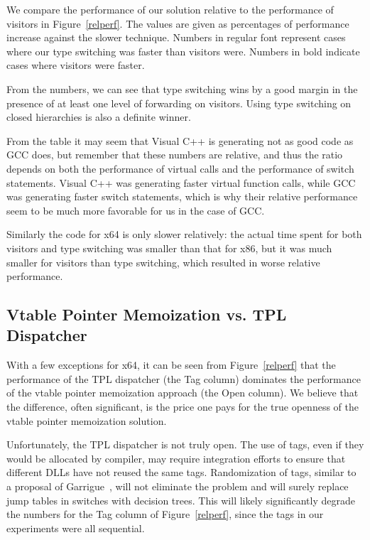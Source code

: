 \documentclass[preprint]{sigplanconf}
\begin{document}
We compare the performance of our solution relative to the performance of visitors in 
Figure~\ref{relperf}. The values are given as percentages of performance increase 
against the slower technique. Numbers in regular font represent cases where our type 
switching was faster than visitors were. Numbers in bold indicate cases where 
visitors were faster.

From the numbers, we can see that type switching wins by a good margin in 
the presence of at least one level of forwarding on visitors. Using type 
switching on closed hierarchies is also a definite winner.

From the table it may seem that Visual C++ is generating not as good code as GCC 
does, but remember that these numbers are relative, and thus the ratio depends on  
both the performance of virtual calls and the performance of switch statements. Visual 
C++ was generating faster virtual function calls, while GCC was generating 
faster switch statements, which is why their relative performance seem to be much 
more favorable for us in the case of GCC.

Similarly the code for x64 is only slower relatively: the actual time spent for 
both visitors and type switching was smaller than that for x86, but it was much 
smaller for visitors than type switching, which resulted in worse relative 
performance.

\subsection{Vtable Pointer Memoization vs. TPL Dispatcher}
\label{sec:cmp}

With a few exceptions for x64, it can be seen from Figure~\ref{relperf} 
that the performance of the TPL dispatcher (the Tag column) dominates the 
performance of the vtable pointer memoization approach (the Open column). We believe 
that the difference, often significant, is the price one pays for the true 
openness of the vtable pointer memoization solution.

Unfortunately, the TPL dispatcher is not truly open. The use of tags, 
even if they would be allocated by compiler, may require integration efforts to 
ensure that different DLLs have not reused the same tags. Randomization of tags,
similar to a proposal of Garrigue~\cite{garrigue-98}, will not eliminate the 
problem and will surely replace jump tables in switches with decision trees. This 
will likely significantly degrade the numbers for the Tag column of 
Figure~\ref{relperf}, since the tags in our experiments were all sequential.
\end{document}
